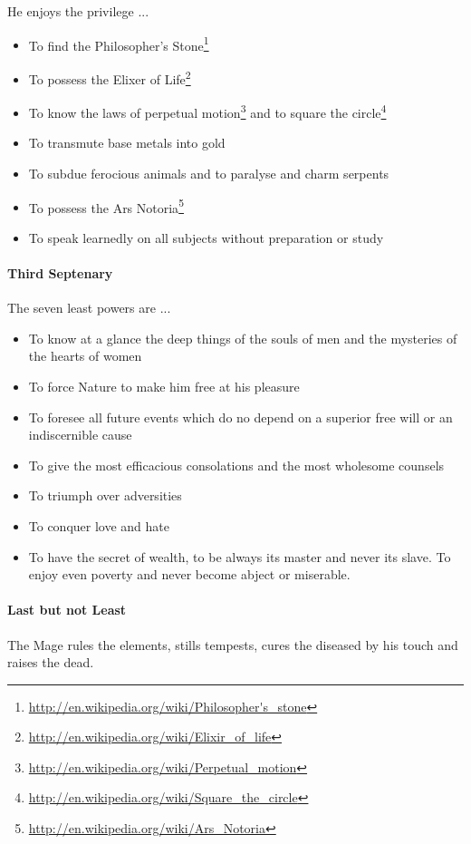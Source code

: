 He enjoys the privilege ... \begin{itemize}


\item To find the Philosopher's Stone\footnote{\url{http://en.wikipedia.org/wiki/Philosopher's\_stone}}

\item To possess the Elixer of Life\footnote{\url{http://en.wikipedia.org/wiki/Elixir\_of\_life}}

\item To know the laws of perpetual motion\footnote{\url{http://en.wikipedia.org/wiki/Perpetual\_motion}} and to square the circle\footnote{\url{http://en.wikipedia.org/wiki/Square\_the\_circle}}

\item To transmute base metals into gold

\item To subdue ferocious animals and to paralyse and charm serpents

\item To possess the Ars Notoria\footnote{\url{http://en.wikipedia.org/wiki/Ars\_Notoria}}

\item To speak learnedly on all subjects without preparation or study
\end{itemize}


\paragraph{Third Septenary}


The seven least powers are ... 

\begin{itemize}


\item To know at a glance the deep things of the souls of men and the mysteries of the hearts of women

\item To force Nature to make him free at his pleasure

\item To foresee all future events which do no depend on a superior free will or an indiscernible cause

\item To give the most efficacious consolations and the most wholesome counsels

\item To triumph over adversities

\item To conquer love and hate

\item To have the secret of wealth, to be always its master and never its slave. To enjoy even poverty and never become abject or miserable.
\end{itemize}


\paragraph{Last but not Least}


The Mage rules the elements, stills tempests, cures the diseased by his touch and raises the dead.



